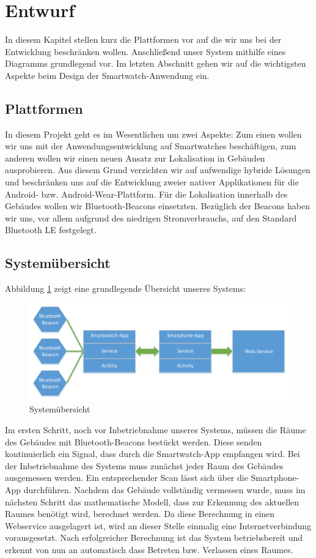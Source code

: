 \section{Entwurf}
In diesem Kapitel stellen kurz die Plattformen vor auf die wir uns bei der Entwicklung beschränken wollen. Anschließend unser System mithilfe eines Diagramms grundlegend vor. Im letzten Abschnitt gehen wir auf die wichtigsten Aspekte beim Design der Smartwatch-Anwendung ein.

\subsection{Plattformen}
In diesem Projekt geht es im Wesentlichen um zwei Aspekte: Zum einen wollen wir uns mit der Anwendungsentwicklung auf Smartwatches beschäftigen, zum anderen wollen wir einen neuen Ansatz zur Lokalisation in Gebäuden ausprobieren. Aus diesem Grund verzichten wir auf aufwendige hybride Lösungen und beschränken uns auf die Entwicklung zweier nativer Applikationen für die Android- bzw. Android-Wear-Plattform. Für die Lokalisation innerhalb des Gebäudes wollen wir Bluetooth-Beacons einsetzten. Bezüglich der Beacons haben wir uns, vor allem aufgrund des niedrigen Stromverbrauchs, auf den Standard Bluetooth LE festgelegt.

\subsection{Systemübersicht}
\label{sec:systemuebersicht}
Abbildung \ref{fig:Übersicht} zeigt eine grundlegende Übersicht unseres Systems:

\begin{figure}[H]
\centering
\includegraphics[width=0.95\linewidth]{Bilder/Uebersicht}
\caption{Systemübersicht}
\label{fig:Übersicht}
\end{figure}

Im ersten Schritt, noch vor Inbetriebnahme unseres Systems, müssen die Räume des Gebäudes mit Bluetooth-Beacons bestückt werden. Diese senden kontinuierlich ein Signal, dass durch die Smartwatch-App empfangen wird. Bei der Inbetriebnahme des Systems muss zunächst jeder Raum des Gebäudes ausgemessen werden. Ein entsprechender Scan lässt sich über die Smartphone-App durchführen. Nachdem das Gebäude vollständig vermessen wurde, muss im nächsten Schritt das mathematische Modell, dass zur Erkennung des aktuellen Raumes benötigt wird, berechnet werden. Da diese Berechnung in einen Webservice ausgelagert ist, wird an dieser Stelle einmalig eine Internetverbindung vorausgesetzt. Nach erfolgreicher Berechnung ist das System betriebsbereit und erkennt von nun an automatisch dass Betreten bzw. Verlassen eines Raumes.

